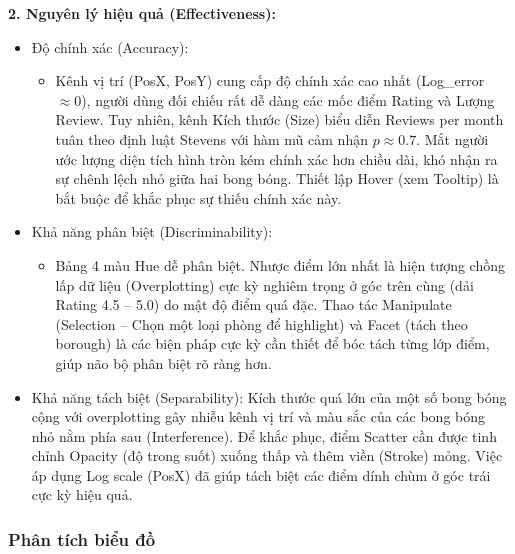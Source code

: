 \textbf{2. Nguyên lý hiệu quả (Effectiveness):}

\begin{itemize}
    \item Độ chính xác (Accuracy):
    \begin{itemize}
        \item Kênh vị trí (PosX, PosY) cung cấp độ chính xác cao nhất (Log\_error $\approx 0$), người dùng đối chiếu rất dễ dàng các mốc điểm Rating và Lượng Review. Tuy nhiên, kênh Kích thước (Size) biểu diễn Reviews per month tuân theo định luật Stevens với hàm mũ cảm nhận $p \approx 0.7$. Mắt người ước lượng diện tích hình tròn kém chính xác hơn chiều dài, khó nhận ra sự chênh lệch nhỏ giữa hai bong bóng. Thiết lập Hover (xem Tooltip) là bắt buộc để khắc phục sự thiếu chính xác này.
    \end{itemize}
    \item Khả năng phân biệt (Discriminability):
    \begin{itemize}
        \item Bảng 4 màu Hue dễ phân biệt. Nhược điểm lớn nhất là hiện tượng chồng lấp dữ liệu (Overplotting) cực kỳ nghiêm trọng ở góc trên cùng (dải Rating 4.5 -- 5.0) do mật độ điểm quá đặc. Thao tác Manipulate (Selection -- Chọn một loại phòng để highlight) và Facet (tách theo borough) là các biện pháp cực kỳ cần thiết để bóc tách từng lớp điểm, giúp não bộ phân biệt rõ ràng hơn.
    \end{itemize}
    \item Khả năng tách biệt (Separability): Kích thước quá lớn của một số bong bóng cộng với overplotting gây nhiễu kênh vị trí và màu sắc của các bong bóng nhỏ nằm phía sau (Interference). Để khắc phục, điểm Scatter cần được tinh chỉnh Opacity (độ trong suốt) xuống thấp và thêm viền (Stroke) mỏng. Việc áp dụng Log scale (PosX) đã giúp tách biệt các điểm dính chùm ở góc trái cực kỳ hiệu quả.
\end{itemize}

\subsubsection{Phân tích biểu đồ}

